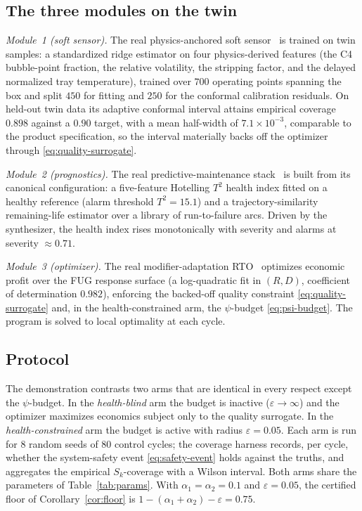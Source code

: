 \subsection{The three modules on the twin}
\label{sec:modules}

\emph{Module~1 (soft sensor).} The real physics-anchored soft
sensor~\citep{busico_m1} is trained on twin samples: a standardized ridge estimator
on four physics-derived features (the C4 bubble-point fraction, the relative
volatility, the stripping factor, and the delayed normalized tray temperature),
trained over $700$ operating points spanning the box and split $450$ for fitting
and $250$ for the conformal calibration residuals. On held-out twin data its adaptive conformal
interval attains empirical coverage $0.898$ against a $0.90$ target, with a mean
half-width of $7.1\times10^{-3}$, comparable to the product specification, so the
interval materially backs off the optimizer through
\eqref{eq:quality-surrogate}.

\emph{Module~2 (prognostics).} The real predictive-maintenance
stack~\citep{busico_m2} is built from its canonical configuration: a five-feature
Hotelling $T^{2}$ health index fitted on a healthy reference (alarm threshold
$T^{2}=15.1$) and a trajectory-similarity remaining-life estimator over a library of
run-to-failure arcs. Driven by the synthesizer, the health index rises
monotonically with severity and alarms at severity $\approx\!0.71$.

\emph{Module~3 (optimizer).} The real modifier-adaptation
RTO~\citep{busico_m3} optimizes economic profit over the FUG response surface
(a log-quadratic fit in $(R,D)$, coefficient of determination $0.982$), enforcing
the backed-off quality constraint \eqref{eq:quality-surrogate} and, in the
health-constrained arm, the $\psi$-budget \eqref{eq:psi-budget}. The program is
solved to local optimality at each cycle.

\subsection{Protocol}
\label{sec:protocol}

The demonstration contrasts two arms that are identical in every respect except the
$\psi$-budget. In the \emph{health-blind} arm the budget is inactive
($\varepsilon\to\infty$) and the optimizer maximizes economics subject only to the
quality surrogate. In the \emph{health-constrained} arm the budget is active with
radius $\varepsilon=0.05$. Each arm is run for $8$ random seeds of $80$ control
cycles; the coverage harness records, per cycle, whether the system-safety event
\eqref{eq:safety-event} holds against the truths, and aggregates the empirical
$S_k$-coverage with a Wilson interval. Both arms share the parameters of
Table~\ref{tab:params}. With $\alpha_1=\alpha_2=0.1$ and $\varepsilon=0.05$, the
certified floor of Corollary~\ref{cor:floor} is
$1-(\alpha_1+\alpha_2)-\varepsilon = 0.75$.

